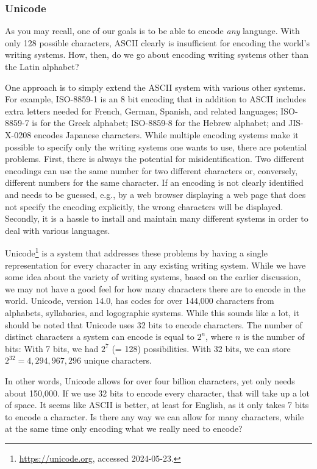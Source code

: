 \subsubsection{Unicode}

As you may recall, one of our goals is to be able to
encode \emph{any} language.  With only 128 possible characters, ASCII
clearly is insufficient for encoding the world's writing systems.
How, then, do we go about encoding writing systems other than the
Latin alphabet?

One approach is to simply extend the ASCII system with various other
systems.  For example, ISO-8859-1 is an 8 bit encoding that in
addition to ASCII includes extra letters needed for French, German,
Spanish, and related languages; ISO-8859-7 is for the Greek alphabet;
ISO-8859-8 for the Hebrew alphabet; and JIS-X-0208 encodes Japanese
characters.  While multiple encoding systems make it possible to
specify only the writing systems one wants to use, there are potential
problems.  First, there is always the potential for misidentification.
Two different encodings can use the same number for two different
characters or, conversely, different numbers for the same character.
If an encoding is not clearly identified and needs to be guessed,
e.g., by a web browser displaying a web page that does not specify the
encoding explicitly, the wrong characters will be displayed.
Secondly, it is a hassle to install and maintain many different
systems in order to deal with various languages.

Unicode\footnote{\url{https://unicode.org}, accessed 2024-05-23.} is a system that addresses
these problems by having a single representation for every character
in any existing writing system. 
While we have some idea about the
variety of writing systems, based on the earlier discussion, we may not have a good feel for how many
characters there are to encode in the world.  Unicode, version 14.0,
has codes for over 144,000
characters from alphabets, syllabaries, and logographic systems.
While this sounds like a lot, it should be noted that Unicode uses 32
bits to encode characters.  The number of distinct characters a system
can encode is equal to $2^n$, where $n$ is the number of bits: With 7
bits, we had $2^7$ (= 128) possibilities.  With 32 bits, we can store
$2^{32} = 4,294,967,296$ unique characters.  

In other words, Unicode allows for
over four billion characters, yet only needs about 150,000.  If we use
32 bits to encode every character, that will take up a lot of space.
It seems like ASCII is better, at least for English, as it only takes
7 bits to encode a character.  Is there any way we can allow for many
characters, while at the same time only encoding what we really need
to encode?

